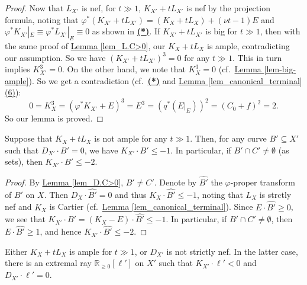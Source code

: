 \begin{proof}
Now that $L_{X'}$ is nef, for $t\gg 1$, $K_{X'}+tL_{X'}$ is nef by the projection formula, noting that $\varphi^*(K_{X'}+tL_{X'})=(K_X+tL_X)+(\nu t-1)E$ and $\varphi^*K_{X'}|_E\equiv \varphi^*L_{X'}|_E\equiv 0$ as shown in \hyperlink{1*}{\textbf{(*)}}.
If $K_{X'}+tL_{X'}$ is  big for $t\gg 1$, then 
with the same proof of {\hyperref[lem_L.C>0]{Lemma \ref*{lem_L.C>0}}}, our $K_X+tL_X$ is ample, contradicting our assumption.
So we have $(K_{X'}+tL_{X'})^3=0$ for any $t\gg 1$. 
This in turn implies $K_{X'}^3=0$. 
On the other hand, we note that $K_X^3=0$ (cf.~{\hyperref[lem-big-ample]{Lemma  \ref*{lem-big-ample}}}). 
So we  get a contradiction (cf.~\hyperlink{1*}{\textbf{(*)}} and {\hyperref[lem_canonical_terminal]{Lemma  \ref*{lem_canonical_terminal} (6)}}):
$$0=K_X^3=(\varphi^*K_{X'}+E)^3=E^3=(q^*(E|_E))^2=(C_0+f)^2=2.$$
So our lemma is proved.
\end{proof}




\begin{lemme}\label{lem_intersect_C_<-1}
Suppose that $K_X+tL_X$ is not ample for any $t\gg 1$.
Then, for any curve $B'\subseteq X'$ such that $D_{X'}\cdot B'=0$, we have $K_{X'}\cdot B'\leqslant -1$.
In particular, if $B'\cap C'\neq\emptyset$ (as sets), then $K_{X'}\cdot B'\leqslant -2$.
\end{lemme}


\begin{proof}
By {\hyperref[lem_D.C>0]{Lemma \ref*{lem_D.C>0}}}, $B'\neq C'$.
Denote by $\hat{B'}$ the $\varphi$-proper transform of $B'$ on $X$.	
Then $D_X\cdot \hat{B'}=0$ and thus $K_{X}\cdot \hat{B'}\leqslant -1$, noting that $L_X$ is strctly nef and  $K_X$ is Cartier (cf.~{\hyperref[lem_canonical_terminal]{Lemma  \ref*{lem_canonical_terminal}}}).
Since $E\cdot \hat{B'}\geqslant 0$, we see that $K_{X'}\cdot B'=(K_X-E)\cdot \hat{B'}\leqslant -1$.
In particular, if $B'\cap C'\neq\emptyset$, then $E\cdot \hat{B'}\geqslant 1$, and hence $K_{X'}\cdot \hat{B'}\leqslant -2$. 
\end{proof}






\begin{lemme}\label{lem_not_big_X'}
Either $K_X+tL_X$ is ample for $t\gg 1$, or $D_{X'}$ is not strictly nef.
In the latter case, there is an extremal ray $\mathbb{R}_{\geqslant 0}[\ell']$ on $X'$ such that $K_{X'}\cdot\ell'<0$ and $D_{X'}\cdot \ell'=0$.
\end{lemme}

